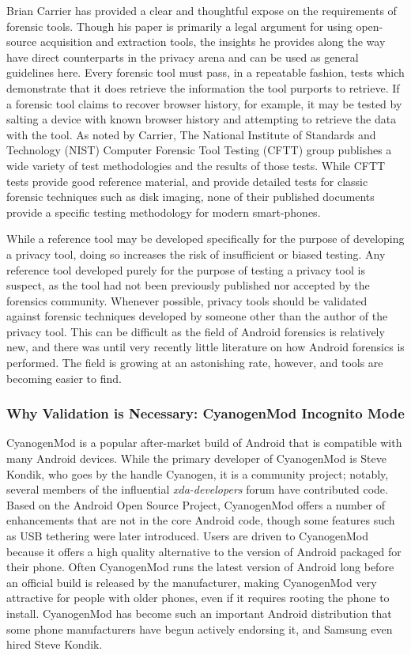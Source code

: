 Brian Carrier has provided a clear and thoughtful expose \cite{Carrier2003} on the requirements of forensic tools.  Though his paper
is primarily a legal argument for using open-source acquisition and extraction tools, the insights he provides along the way have
direct counterparts in the privacy arena and can be used as general guidelines here.  Every forensic tool must pass, in a repeatable
fashion, tests which demonstrate that it does retrieve the information the tool purports to retrieve.  If a forensic tool claims to
recover browser history, for example, it may be tested by salting a device with known browser history and attempting to retrieve the
data with the tool.  As noted by Carrier, The National Institute of Standards and Technology (NIST) Computer Forensic Tool Testing
(CFTT) group publishes a wide variety of test methodologies and the results of those tests.  While CFTT tests provide good reference
material, and provide detailed tests for classic forensic techniques such as disk imaging, none of their published documents provide
a specific testing methodology for modern smart-phones. 

While a reference tool may be developed specifically for the purpose of developing a privacy tool, doing so increases the risk of
insufficient or biased testing.  Any reference tool developed purely for the purpose of testing a privacy tool is suspect, as the
tool had not been previously published nor accepted by the forensics community.  Whenever possible, privacy tools should be
validated against forensic techniques developed by someone other than the author of the privacy tool.  This can be difficult as the
field of Android forensics is relatively new, and there was until very recently little literature on how Android forensics is
performed. The field is growing at an astonishing rate, however, and tools are becoming easier to find.

\subsubsection{Why Validation is Necessary: CyanogenMod Incognito Mode}

CyanogenMod is a popular after-market build of Android that is compatible with many Android devices.  While the primary developer of
CyanogenMod is Steve Kondik, who goes by the handle Cyanogen, it is a community project; notably, several members of the
influential \emph{xda-developers} forum have contributed code.  Based on the Android Open Source Project, CyanogenMod offers a
number of enhancements that are not in the core Android code, though some features such as USB tethering were later introduced.
Users are driven to CyanogenMod because it offers a high quality alternative to the version of Android packaged for their
phone.  Often CyanogenMod runs the latest version of Android long before an official build is released by the manufacturer, making
CyanogenMod very attractive for people with older phones, even if it requires rooting the phone to install.  CyanogenMod has become
such an important Android distribution that some phone manufacturers have begun actively endorsing it, and Samsung even hired Steve
Kondik.

